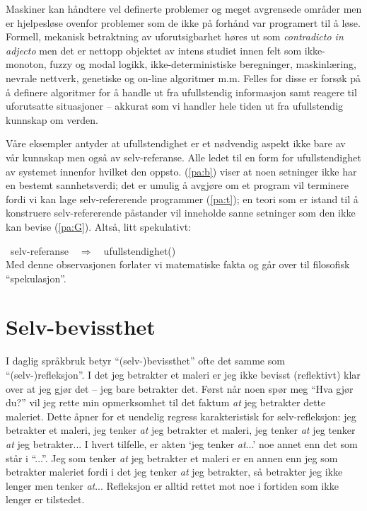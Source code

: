 \documentclass[10pt,twocolumn]{article}
\newcounter{EQ}
\newcommand{\equ}[1]{\refstepcounter{EQ}\vspace{.5ex}\par\noindent\ 
    \hfill #1\hfill{(\theEQ)}\\[.5ex]}
\newcommand{\refp}[1]{(\ref{#1})}
\newcommand{\<}{\langle}
\renewcommand{\>}{\rangle}
\begin{document}
Maskiner kan h{\aa}ndtere  vel 
definerte problemer og meget avgrensede omr{\aa}der men er hjelpesl{\o}se 
 ovenfor problemer som de ikke p{\aa} forh{\aa}nd var 
programert til {\aa} l{\o}se. Formell, mekanisk betraktning av uforutsigbarhet 
h{\o}res ut som {\em contradicto in adjecto} men det er nettopp objektet
av intens studiet 
innen felt som ikke-monoton, fuzzy og modal logikk,
ikke-deterministiske beregninger,
maskinl{\ae}ring, nevrale nettverk, genetiske og on-line algoritmer 
m.m. Felles for disse er fors{\o}k p{\aa} {\aa} definere algoritmer
for {\aa} handle ut fra ufullstendig informasjon samt reagere til 
uforutsatte situasjoner -- akkurat som vi handler hele tiden ut fra 
ufullstendig kunnskap om verden.

V{\aa}re eksempler antyder at ufullstendighet er 
et n{\o}dvendig aspekt ikke bare av v{\aa}r kunnskap men ogs{\aa} av selv-referanse.
Alle ledet til en form for ufullstendighet av 
systemet innenfor hvilket den oppsto. 
\refp{pa:b} %
viser at noen setninger ikke har en bestemt sannhetsverdi;
det er umulig {\aa} avgj{\o}re om et program vil 
terminere fordi vi kan lage selv-refererende 
programmer \refp{pa:t}; en teori som er istand til {\aa} konstruere 
selv-refererende p{\aa}stander vil inneholde sanne setninger som den 
ikke kan bevise \refp{pa:G}. Alts{\aa}, litt spekulativt:
\equ{selv-referanse\ \ $\Rightarrow$\ \ ufullstendighet}\label{eq:ufu}
Med denne observasjonen forlater vi matematiske fakta
 og g{\aa}r over til filosofisk ``spekulasjon''.

\section{Selv-bevissthet}
I daglig spr{\aa}kbruk betyr ``(selv-)bevissthet'' ofte det samme som 
``(selv-)refleksjon''. I det jeg betrakter et maleri er jeg ikke bevisst 
(reflektivt) klar over at jeg gj{\o}r det -- jeg bare betrakter det. 
F{\o}rst n{\aa}r noen sp{\o}r meg ``Hva gj{\o}r du?'' vil jeg rette 
min opmerksomhet til det faktum {\em at} jeg betrakter dette maleriet. 
Dette {\aa}pner for et uendelig regress karakteristisk for 
selv-refleksjon: jeg betrakter et maleri, jeg tenker {\em at} jeg betrakter et 
maleri, jeg tenker {\em at} jeg tenker {\em at} jeg betrakter... I hvert 
tilfelle, er akten `jeg tenker {\em at}...' noe annet enn det som st{\aa}r 
i ``...''. Jeg som tenker {\em at} jeg betrakter et maleri er en annen enn jeg 
som betrakter maleriet fordi i det jeg tenker {\em at} jeg betrakter, 
s{\aa} betrakter jeg ikke lenger men tenker {\em at}... Refleksjon er alltid 
rettet mot noe i fortiden som ikke lenger er tilstedet.
\end{document}
